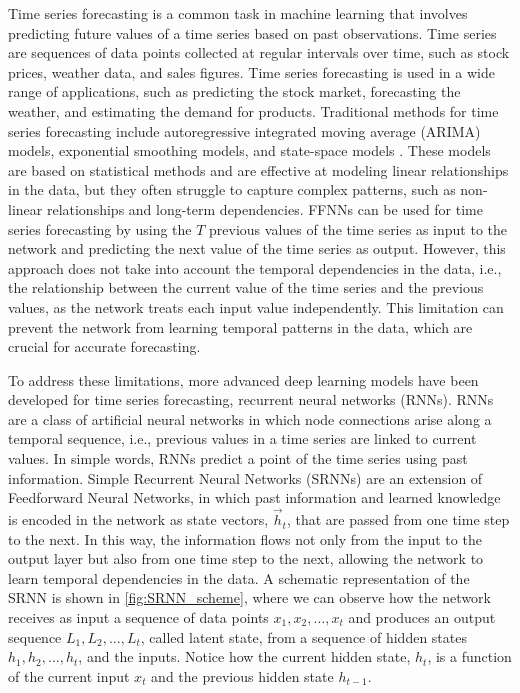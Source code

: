 Time series forecasting is a common task in machine learning that involves
predicting future values of a time series based on past observations. Time
series are sequences of data points collected at regular intervals over time,
such as stock prices, weather data, and sales figures. Time series forecasting
is used in a wide range of applications, such as predicting the stock market,
forecasting the weather, and estimating the demand for products. Traditional
methods for time series forecasting include autoregressive integrated moving
average (ARIMA) models, exponential smoothing models, and state-space models
\cite{Hyndman2018}. These models are based on statistical methods and are
effective at modeling linear relationships in the data, but they often
struggle to capture complex patterns, such as non-linear relationships and
long-term dependencies. FFNNs can be used for time series forecasting by using
the $T$
previous values of the time series as input to the network and predicting the
next value of the time series as output. However, this approach does not take
into account the temporal dependencies in the data, i.e., the relationship
between the current value of the time series and the previous values, as the
network treats each input value independently. This limitation can prevent
the
network from learning temporal patterns in the data, which are crucial for
accurate forecasting.

To address these limitations, more advanced deep learning models have been
developed for time series forecasting, recurrent neural networks (RNNs). RNNs
are a class of artificial neural networks in which node connections arise
along
a temporal sequence, i.e., previous values in a time series are linked to
current values. In simple words, RNNs predict a point of the time series
using
past information. Simple Recurrent Neural Networks (SRNNs) are an extension
of
Feedforward Neural Networks, in which past information and learned knowledge
is
encoded in the network as state vectors, $\vec{h}_t$, that are passed from
one
time step to the next. In this way, the information flows not only from the
input to the output layer but also from one time step to the next,
allowing the network to learn temporal dependencies in the data. A schematic
representation of the SRNN is shown in \cref{fig:SRNN_scheme}, where we can
observe how the network receives as input a sequence of data points $x_1,
  x_2,
  \ldots, x_t$ and produces an output sequence $L_1, L_2, \ldots, L_t$, called
latent state, from a sequence of hidden states $h_1, h_2, \ldots, h_t$, and
the
inputs. Notice how the current hidden state, $h_t$, is a function of the
current input $x_{t}$ and the previous hidden state $h_{t-1}$.

